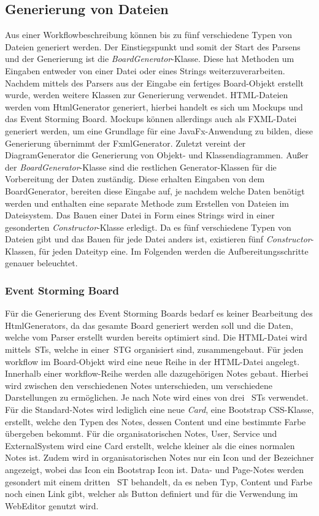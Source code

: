 \subsection{Generierung von Dateien}\label{subsec:generierung-von-dateien}
Aus einer Workflowbeschreibung können bis zu fünf verschiedene Typen von Dateien generiert werden.
Der Einstiegspunkt und somit der Start des Parsens und der Generierung ist die \textit{BoardGenerator}-Klasse.
Diese hat Methoden um Eingaben entweder von einer Datei oder eines Strings weiterzuverarbeiten.
Nachdem mittels des Parsers aus der Eingabe ein fertiges Board-Objekt erstellt wurde, werden weitere Klassen zur Generierung verwendet.
HTML-Dateien werden vom HtmlGenerator generiert, hierbei handelt es sich um Mockups und das Event Storming Board.
Mockups können allerdings auch als FXML-Datei generiert werden, um eine Grundlage für eine JavaFx-Anwendung zu bilden, diese Generierung
übernimmt der FxmlGenerator.
Zuletzt vereint der DiagramGenerator die Generierung von Objekt- und Klassendiagrammen.
Außer der \textit{BoardGenerator}-Klasse sind die restlichen Generator-Klassen für die Vorbereitung der Daten zuständig.
Diese erhalten Eingaben von dem BoardGenerator, bereiten diese Eingabe auf, je nachdem welche Daten benötigt werden und enthalten eine
separate Methode zum Erstellen von Dateien im Dateisystem.
Das Bauen einer Datei in Form eines Strings wird in einer gesonderten \textit{Constructor}-Klasse erledigt.
Da es fünf verschiedene Typen von Dateien gibt und das Bauen für jede Datei anders ist, existieren fünf \textit{Constructor}-Klassen, für jeden Dateityp eine.
Im Folgenden werden die Aufbereitungsschritte genauer beleuchtet.

\subsubsection{Event Storming Board}
Für die Generierung des Event Storming Boards bedarf es keiner Bearbeitung des HtmlGenerators, da das gesamte Board generiert werden soll und die Daten,
welche vom Parser erstellt wurden bereits optimiert sind.
Die HTML-Datei wird mittels~\ac{ST}s, welche in einer~\ac{STG} organisiert sind, zusammengebaut.
Für jeden workflow im Board-Objekt wird eine neue Reihe in der HTML-Datei angelegt.
Innerhalb einer workflow-Reihe werden alle dazugehörigen Notes gebaut.
Hierbei wird zwischen den verschiedenen Notes unterschieden, um verschiedene Darstellungen zu ermöglichen.
Je nach Note wird eines von drei ~\ac{ST}s verwendet.
Für die Standard-Notes wird lediglich eine neue \textit{Card}, eine Bootstrap CSS-Klasse, erstellt, welche den Typen des Notes, dessen Content und eine bestimmte Farbe übergeben bekommt.
Für die organisatorischen Notes, User, Service und ExternalSystem wird eine Card erstellt, welche kleiner als die eines normalen Notes ist.
Zudem wird in organisatorischen Notes nur ein Icon und der Bezeichner angezeigt, wobei das Icon ein Bootstrap Icon ist.
Data- und Page-Notes werden gesondert mit einem dritten ~\ac{ST} behandelt, da es neben Typ, Content und Farbe noch einen Link gibt, welcher als Button definiert und für die Verwendung
im WebEditor genutzt wird.

